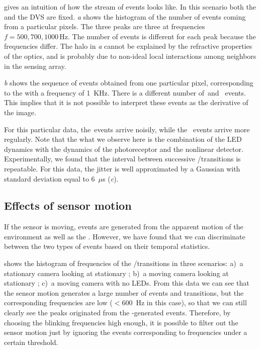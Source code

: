  gives an intuition of how the stream
of events looks like. In this scenario both the \ALMs and the DVS
are fixed. \emph{a} shows the histogram
of the number of events coming from a particular pixels. The three
peaks are three \ALMs at frequencies $f=500,700,1000\,\mbox{Hz}$.
The number of events is different for each peak because the frequencies
differ. The halo in \emph{a} cannot be
explained by the refractive properties of the optics, and is probably
due to non-ideal local interactions among neighbors in the sensing
array.

\emph{b} shows the sequence of events
obtained from one particular pixel, corresponding to the \ALM  with
a frequency of 1~KHz. There is a different number of~\pP and~\pN
events. This implies that it is not possible to interpret these events
as the derivative of the image.

For this particular data, the~\pP events arrive noisily, while the~\pN
events arrive more regularly. Note that the what we observe here is
the combination of the LED dynamics with the dynamics of the photoreceptor
and the nonlinear detector. Experimentally, we found that the interval
between successive \pP/\pN transitions is repeatable. For this data,
the jitter is well approximated by a Gaussian with standard deviation
equal to $6$~$\mu$s (\emph{c}).


\subsection{Effects of sensor motion\label{sub:Alternate-events-and-motion}}

If the sensor is moving, events are generated from the apparent motion
of the environment as well as the \ALMs. However, we have found that
we can discriminate between the two types of events based on their
temporal statistics. 

 shows the histogram of frequencies of
the \pP/\pN transitions in three scenarios: a)~a stationary camera
looking at stationary \ALMs; b)~a moving camera looking at stationary
\ALMs; c)~a moving camera with no LEDs. From this data we can see
that the sensor motion generates a large number of events and transitions,
but the corresponding frequencies are low ($<600$~Hz in this case),
so that we can still clearly see the peaks originated from the \ALMs-generated
events. Therefore, by choosing the blinking frequencies high enough,
it is possible to filter out the sensor motion just by ignoring the
events corresponding to frequencies under a certain threshold. 

